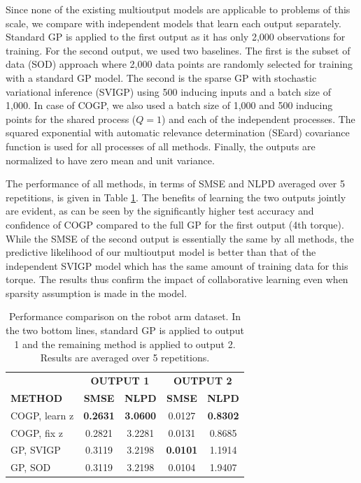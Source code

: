 Since none of the existing multioutput models are applicable to problems of this scale, we compare with independent models that learn each output separately.
Standard GP is applied to the first output as it has only 2,000 observations for training.
For the second output, we used two baselines.
The first is the subset of data (SOD) approach where 2,000 data points are randomly selected for training with a standard GP model.
The second is the sparse GP with stochastic variational inference (SVIGP) using 500 inducing inputs and a batch size of 1,000.
In case of COGP, we also used a batch size of 1,000 and 500 inducing points for the shared process ($Q = 1$) and each of the independent processes.
The squared exponential with automatic relevance determination (SEard) covariance function is used for all processes of all methods.
Finally, the outputs are normalized to have zero mean and unit variance. 

The performance of all methods, in terms of SMSE and NLPD averaged over 5 repetitions, is given in Table \ref{tab:robotarm}.
The benefits of learning the two outputs jointly are evident, as can be seen by the significantly higher test accuracy and confidence of COGP compared to the full GP for the first output (4th torque).
While the SMSE of the second output is essentially the same by all methods, the predictive likelihood of our multioutput model is better than that of the independent SVIGP model which has the same amount of training data for this torque.
The results thus confirm the impact of collaborative learning even when sparsity assumption is made in the model.

\begin{table}[t]
\caption{Performance comparison on the robot arm dataset. In the two bottom lines, standard GP is applied to output 1 and the remaining method is applied to output 2. Results are averaged over 5 repetitions.}
\label{tab:robotarm}
\begin{center}
\begin{tabular}{lcccc}
\toprule
& \multicolumn{2}{c}{\textbf{OUTPUT 1}} & \multicolumn{2}{c}{\textbf{OUTPUT 2}} \\ \cmidrule(r){2-5}
\textbf{METHOD} & \textbf{SMSE} & \textbf{NLPD} & \textbf{SMSE} & \textbf{NLPD}\\ 
 \midrule
COGP, learn z & \textbf{0.2631} & \textbf{3.0600} & 0.0127 & \textbf{0.8302} \\
COGP, fix z & 0.2821& 3.2281 & 0.0131 & 0.8685 \\
GP, SVIGP & 0.3119 & 3.2198 & \textbf{0.0101} & 1.1914 \\
GP, SOD & 0.3119 & 3.2198 & 0.0104 & 1.9407 \\
\bottomrule
\end{tabular}
\end{center}
\end{table}

